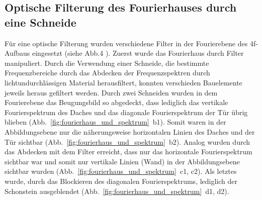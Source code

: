 \subsection{Optische Filterung des Fourierhauses durch eine Schneide}

Für eine optische Filterung wurden verschiedene Filter in der Fourierebene des 4f-Aufbaus eingesetzt (siehe Abb.4%
). Zuerst wurde das Fourierhaus durch Filter manipuliert. Durch die Verwendung einer Schneide, die bestimmte Frequenzbereiche durch das Abdecken der Frequenzspektren durch lichtundurchlässigen Material herausfiltert, konnten verschieden Bauelemente jeweils heraus gefiltert werden. Durch zwei Schneiden wurden in dem Fourierebene das Beugungsbild so abgedeckt, dass lediglich das vertikale Fourierspektrum des Daches und das diagonale Fourierspektrum der Tür übrig blieben (Abb.~\ref{fig:fourierhaus_und_spektrum}~b1). Somit waren in der Abbildungsebene nur die näherungsweise horizontalen Linien des Daches und der Tür sichtbar (Abb.~\ref{fig:fourierhaus_und_spektrum}~b2). Analog wurden durch das Abdecken mit dem Filter erreicht, dass nur das horizontale Fourierspektrum sichtbar war und somit nur vertikale Linien (Wand) in der Abbildungsebene sichtbar wurden (Abb.~\ref{fig:fourierhaus_und_spektrum}~c1, c2). Als letztes wurde, durch das Blockieren des diagonalen Fourierspektrums, lediglich der Schonstein ausgeblendet (Abb.~\ref{fig:fourierhaus_und_spektrum}~d1, d2).

